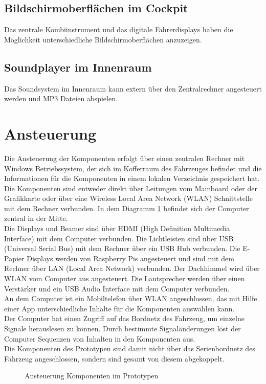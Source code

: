 \subsection{Bildschirmoberflächen im Cockpit}
Das zentrale Kombiinstrument und das digitale Fahrerdisplays haben die Möglichkeit unterschiedliche Bildschirmoberflächen anzuzeigen.
\subsection{Soundplayer im Innenraum}
Das Soundsystem im Innenraum kann extern über den Zentralrechner angesteuert werden und MP3 Dateien abspielen.
\section{Ansteuerung}
Die Ansteuerung der Komponenten erfolgt über einen zentralen Rechner mit Windows Betriebssystem, der sich im Kofferraum des Fahrzeuges befindet und die Informationen für die Komponenten in einem lokalen Verzeichnis gespeichert hat. Die Komponenten sind entweder direkt über Leitungen vom Mainboard oder der Grafikkarte oder über eine Wireless Local Area Network (WLAN) Schnittstelle mit dem Rechner verbunden. In dem Diagramm \ref{fig:tikz_ansteuerung} befindet sich der Computer zentral in der Mitte.\\
Die Displays und Beamer sind über HDMI (High Definition Multimedia Interface) mit dem Computer verbunden. Die Lichtleisten sind über USB (Universal Serial Bus) mit dem Rechner über ein USB Hub verbunden. Die E-Papier Displays werden von Raspberry Pis angesteuert und sind mit dem Rechner über LAN (Local Area Network) verbunden. Der Dachhimmel wird über WLAN vom Computer aus angesteuert. Die Lautsprecher werden über einen Verstärker und ein USB Audio Interface mit dem Computer verbunden.\\
An dem Computer ist ein Mobiltelefon über WLAN angeschlossen, das mit Hilfe einer App unterschiedliche Inhalte für die Komponenten auswählen kann.\\
Der Computer hat einen Zugriff auf das Bordnetz des Fahrzeug, um einzelne Signale herauslesen zu können. Durch bestimmte Signaländerungen löst der Computer Sequenzen von Inhalten in den Komponenten aus.\\
Die Komponenten des Prototypen sind damit nicht über das Serienbordnetz des Fahrzeug angeschlossen, sondern sind gesamt von diesem abgekoppelt.

\begin{figure}[hbt]
	\centering
	
	\caption[Ansteuerung Komponenten im Prototypen]{Ansteuerung Komponenten im Prototypen}
	\label{fig:tikz_ansteuerung}
\end{figure}